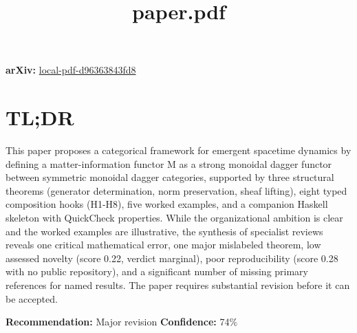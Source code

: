 \documentclass[11pt]{article}
\title{paper.pdf}
\date{}
\begin{document}
\maketitle

\noindent\textbf{arXiv:} \href{https://arxiv.org/abs/local-pdf-d96363843fd8}{local-pdf-d96363843fd8}\\

\section*{TL;DR}
This paper proposes a categorical framework for emergent spacetime dynamics by defining a matter-information functor M as a strong monoidal dagger functor between symmetric monoidal dagger categories, supported by three structural theorems (generator determination, norm preservation, sheaf lifting), eight typed composition hooks (H1-H8), five worked examples, and a companion Haskell skeleton with QuickCheck properties. While the organizational ambition is clear and the worked examples are illustrative, the synthesis of specialist reviews reveals one critical mathematical error, one major mislabeled theorem, low assessed novelty (score 0.22, verdict marginal), poor reproducibility (score 0.28 with no public repository), and a significant number of missing primary references for named results. The paper requires substantial revision before it can be accepted.

\textbf{Recommendation:} Major revision \quad \textbf{Confidence:} 74\%\\
\end{document}
